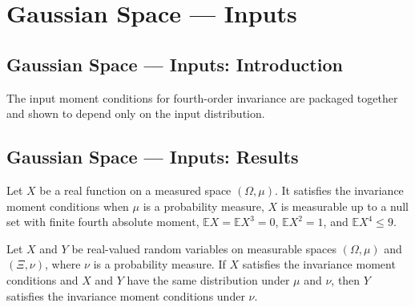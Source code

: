 \section{Gaussian Space --- Inputs}
\subsection*{Gaussian Space --- Inputs: Introduction}
The input moment conditions for fourth-order invariance are packaged together and shown to depend only on the input distribution.

\subsection*{Gaussian Space --- Inputs: Results}

\begin{definition}
\leanok
{}
Let $X$ be a real function on a measured space $(\Omega,\mu)$. It satisfies the invariance moment conditions when $\mu$ is a probability measure, $X$ is measurable up to a null set with finite fourth absolute moment, $\mathbb E X=\mathbb E X^3=0$, $\mathbb E X^2=1$, and $\mathbb E X^4\le9$.
\end{definition}

\begin{theorem}
\leanok
{}
Let $X$ and $Y$ be real-valued random variables on measurable spaces $(\Omega,\mu)$ and
$(\Xi,\nu)$, where $\nu$ is a probability measure. If $X$ satisfies the invariance
moment conditions and $X$ and $Y$ have the same distribution under $\mu$ and $\nu$, then
$Y$ satisfies the invariance moment conditions under $\nu$.
\end{theorem}
